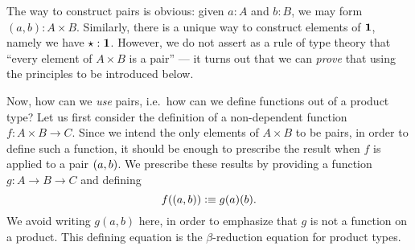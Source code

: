 The way to construct pairs is obvious: given $a:A$ and $b:B$, we may form $(a,b):A\times B$.
Similarly, there is a unique way to construct elements of $\mathbf{1}$, namely we have $\star:\mathbf{1}$.
However, we do not assert as a rule of type theory that ``every element of $A\times B$ is a pair'' --- it turns out that we can \emph{prove} that using the principles to be introduced below.

Now, how can we \emph{use} pairs, i.e.\ how can we define functions out of a product type?
Let us first consider the definition of a non-dependent function $f : A\times B \to C$.
Since we intend the only elements of $A\times B$ to be pairs, in order to define such a function, it should be enough to prescribe the result
when $f$ is applied to a pair $(a,b)$.  We prescribe these results by
providing a function $g : A \to B \to C$ and defining 
\[ f((a,b)) \vcentcolon\equiv g(a)(b). \]
We avoid writing $g(a,b)$ here, in order to emphasize that $g$ is not a
function on a product.  This defining equation is the $\beta$-reduction equation for product types.

